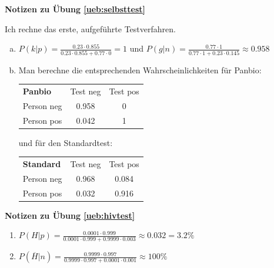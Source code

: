 \documentclass[%
<<<<<<< Updated upstream
11pt,%
twoside,%
titlepage,%
german,%
=======
11pt,%
twoside,%
titlepage,%
swissgerman,%
>>>>>>> Stashed changes
headsepline%
]{scrartcl}
\newcommand{\faReturnGray}{\textcolor{gray}{\faMailReply}} %
\newcommand{\spaltenheight}{\rule{0mm}{3ex}}
\newcommand{\spaltensep}{\\[1ex]}
\theoremstyle{definition}
\theoremstyle{plain}
\newcommand{\concatueb}[1]{ueb:#1}%
\newcommand{\concatlsg}[1]{lsg:#1}%
\newenvironment{lsg}[1]{%
    \par\noindent\textbf{Notizen zu Übung \ref{\concatueb{#1}}}\label{\concatlsg{#1}}
    \hfill\hyperref[\concatueb{#1}]{\faReturnGray}\par %
}{%
    \par%
}
\newcommand{\concatueb}[1]{ueb:#1}%
\newcommand{\concatlsg}[1]{lsg:#1}%
\newenvironment{lsg}[1]{%
    \par\noindent\textbf{Notizen zu Übung \ref{\concatueb{#1}}.}%
    \label{\concatlsg{#1}}
}{%
    \par%
}
\begin{document}
\begin{lsg}{selbsttest}
Ich rechne das erste, aufgeführte Testverfahren.
    \begin{enumerate}[a)]
        \item $P(k|p)=\frac{0.23\cdot0.855}{0.23\cdot0.855+0.77\cdot0}=1$ und $P(g|n)=\frac{0.77\cdot1}{0.77\cdot1+0.23\cdot0.145}\approx0.958$

        \item Man berechne die entsprechenden Wahrscheinlichkeiten für Panbio:\\
        
        \begin{table}[h!]
\begin{center}
\begin{tabular}{|l|c|c|}
\hline
\rowcolor{Gray}\spaltenheight \textbf{Panbio} & Test neg & Test pos \spaltensep \hhline{|-|-|-|}
\rowcolor{lightyellow}\spaltenheight  Person neg & 0.958 & 0 \spaltensep \hhline{|-|-|-|}
\rowcolor{Gray}\spaltenheight  Person pos & 0.042 & 1 \spaltensep \hline
\end{tabular}
\end{center}
\end{table}

und für den Standardtest:\\
        
        \begin{table}[h!]
\begin{center}
\begin{tabular}{|l|c|c|}
\hline
\rowcolor{Gray}\spaltenheight \textbf{Standard} & Test neg & Test pos \spaltensep \hhline{|-|-|-|}
\rowcolor{lightyellow}\spaltenheight  Person neg & 0.968 & 0.084 \spaltensep \hhline{|-|-|-|}
\rowcolor{Gray}\spaltenheight  Person pos & 0.032 & 0.916 \spaltensep \hline
\end{tabular}
\end{center}
\end{table}
    \end{enumerate}
\end{lsg}
\begin{lsg}{hivtest}
\begin{enumerate}
    \item $P(H|p)=\frac{0.0001\cdot0.999}{0.0001\cdot0.999+0.9999\cdot0.003}\approx0.032=3.2\%$
    \item $P(\overline{H}|n)=\frac{0.9999\cdot0.997}{0.9999\cdot0.997+0.0001\cdot0.001}\approx100\%$
\end{enumerate}
\end{lsg}
\end{document}

